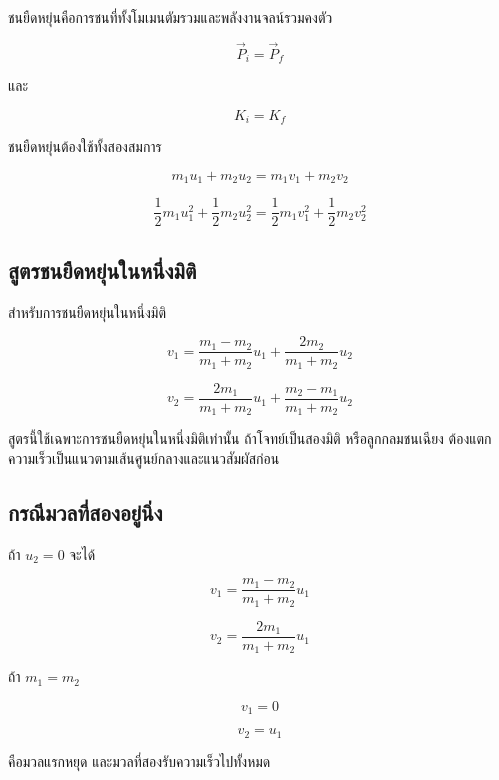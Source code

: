 ชนยืดหยุ่นคือการชนที่ทั้งโมเมนตัมรวมและพลังงานจลน์รวมคงตัว

\[
\vec{P}_i=\vec{P}_f
\]

และ

\[
K_i=K_f
\]

\begin{tcolorbox}[title=ชนยืดหยุ่น]
ชนยืดหยุ่นต้องใช้ทั้งสองสมการ

\[
m_1u_1+m_2u_2=m_1v_1+m_2v_2
\]

\[
\frac{1}{2}m_1u_1^2+\frac{1}{2}m_2u_2^2
=
\frac{1}{2}m_1v_1^2+\frac{1}{2}m_2v_2^2
\]
\end{tcolorbox}

\subsection{สูตรชนยืดหยุ่นในหนึ่งมิติ}

สำหรับการชนยืดหยุ่นในหนึ่งมิติ

\[
v_1=
\frac{m_1-m_2}{m_1+m_2}u_1
+
\frac{2m_2}{m_1+m_2}u_2
\]

\[
v_2=
\frac{2m_1}{m_1+m_2}u_1
+
\frac{m_2-m_1}{m_1+m_2}u_2
\]

\begin{tcolorbox}[title=ข้อควรระวัง]
สูตรนี้ใช้เฉพาะการชนยืดหยุ่นในหนึ่งมิติเท่านั้น ถ้าโจทย์เป็นสองมิติ หรือลูกกลมชนเฉียง ต้องแตกความเร็วเป็นแนวตามเส้นศูนย์กลางและแนวสัมผัสก่อน
\end{tcolorbox}

\subsection{กรณีมวลที่สองอยู่นิ่ง}

ถ้า $u_2=0$ จะได้

\[
v_1=\frac{m_1-m_2}{m_1+m_2}u_1
\]

\[
v_2=\frac{2m_1}{m_1+m_2}u_1
\]

ถ้า $m_1=m_2$

\[
v_1=0
\]

\[
v_2=u_1
\]

คือมวลแรกหยุด และมวลที่สองรับความเร็วไปทั้งหมด

